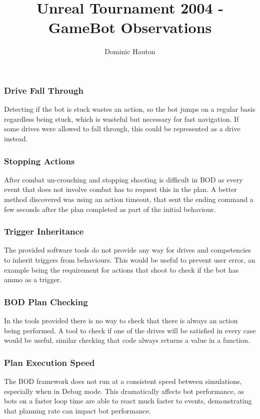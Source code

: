 \documentclass[a4paper,12pt,twocolumn]{report}
\title{Unreal Tournament 2004 - GameBot Observations}
\author{Dominic Hauton}
\begin{document}
\maketitle

\subsubsection{Drive Fall Through}
Detecting if the bot is stuck wastes an action, so the bot jumps on a regular basis regardless being stuck, which is wasteful but necessary for fast navigation. If some drives were allowed to fall through, this could be represented as a drive instead.

\subsubsection{Stopping Actions}
After combat un-crouching and stopping shooting is difficult in BOD as every event that does not involve combat has to request this in the plan. A better method discovered was using an action timeout, that sent the ending command a few seconds after the plan completed as part of the initial behaviour.

\subsubsection{Trigger Inheritance}
The provided software tools do not provide any way for drives and competencies to inherit triggers from behaviours. This would be useful to prevent user error, an example being the requirement for actions that shoot to check if the bot has ammo as a trigger.

\subsubsection{BOD Plan Checking}
In the tools provided there is no way to check that there is always an action being performed. A tool to check if one of the drives will be satisfied in every case would be useful, similar checking that code always returns a value in a function.

\subsubsection{Plan Execution Speed}
The BOD framework does not run at a consistent speed between simulations, especially when in Debug mode. This dramatically affects bot performance, as bots on a faster loop time are able to react much faster to events, demonstrating that planning rate can impact bot performance.
\end{document}
